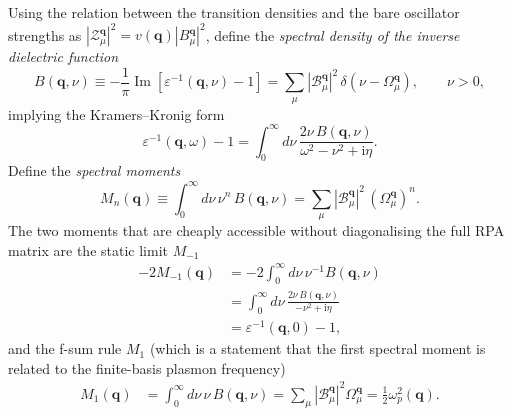 \documentclass[11pt]{article}
\newcommand{\bq}{\mathbf{q}}
\newcommand{\Om}{\Omega}
\newcommand{\eps}{\varepsilon}
\newcommand{\ii}{\mathrm{i}}
\begin{document}
Using the relation between the transition densities and the bare oscillator strengths as $\left|\mathcal{Z}_\mu^{\bq}\right|^2=v(\mathbf{q})\left|B_\mu^{\bq}\right|^2$, define the \emph{spectral density of the inverse dielectric function}
\begin{equation}
  B(\bq,\nu) \equiv -\frac{1}{\pi}
    \operatorname{Im}\!\left[\eps^{-1}(\bq,\nu)-1\right]
  = \sum_\mu |\mathcal{B}_\mu^{\bq}|^2\,\delta(\nu-\Om_\mu^{\bq}),
  \qquad \nu>0,
  \label{eq:B-def}
\end{equation}
implying the Kramers--Kronig form
\begin{equation}
  \eps^{-1}(\bq,\omega)-1
  = \int_0^\infty d\nu\,\frac{2\nu\,B(\bq,\nu)}{\omega^2-\nu^2+\ii\eta}.
  \label{eq:KK}
\end{equation}
Define the \emph{spectral moments}
\begin{equation}
  M_n(\bq) \equiv \int_0^\infty d\nu\,\nu^n\,B(\bq,\nu)
  = \sum_\mu |\mathcal{B}_\mu^{\bq}|^2\,(\Om_\mu^{\bq})^n .
\end{equation}
The two moments that are cheaply accessible without diagonalising the
full RPA matrix are the static limit $M_{-1}$
\begin{align}
    -2M_{-1}(\bq)  &= -2\int_0^\infty d\nu\,
     \nu^{-1}B(\bq,\nu) \\
    &= \int_0^\infty d\nu\,\frac{2\nu\,B(\bq,\nu)}{-\nu^2+\ii\eta} \\
    &= \eps^{-1}(\bq,0)-1, \label{eq:M-1}
\end{align}
and the f-sum rule $M_1$ (which is a statement that the first spectral moment is related to the finite-basis plasmon frequency)
\begin{align}
  M_1(\bq)
  &= \int_0^\infty d\nu\,\nu\,B(\bq,\nu) = \sum_\mu |\mathcal{B}_\mu^{\bq}|^2\Omega_\mu^{\bq} = \frac{1}{2}\omega_p^2(\bq).
  \label{eq:M1}
\end{align}
\end{document}
